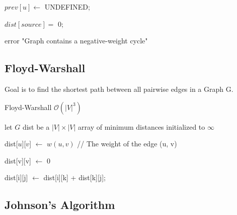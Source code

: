 \documentclass[9pt,landscape,a4paper, table]{extarticle}
\begin{document}
\begin{multicols*}{3}
{\begin{algorithm}[H]
{        $prev[u] \leftarrow$ UNDEFINED;
    
    }
    $dist[source] =$ 0;
    

    
    {
        {
            error "Graph contains a negative-weight cycle"
        }
    }
\end{algorithm}}




\subsection{Floyd-Warshall}

Goal is to find the shortest path between all pairwise edges in a Graph G.

{\scriptsize
\begin{algorithm}[H]
    \caption{Floyd-Warshall $\mathcal{O}(|V|^3) $}
    
    \SetAlgoLined
    
    
    let $G$ dist be a $|V| × |V|$ array of minimum distances initialized to $\infty$
    
    
{
    dist[$u$][$v$] $\leftarrow$ $w(u, v)$  // The weight of the edge (u, v)
}

{
    dist[v][v] $\leftarrow$ 0
}

{
     {
         { 
             { 
                dist[i][j] $\leftarrow$ dist[i][k] + dist[k][j];
                
            }
        }
    }
}
\end{algorithm}}



\subsection{Johnson's Algorithm}


\end{multicols*}
\end{document}
